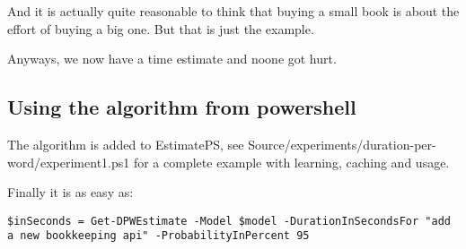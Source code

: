 And it is actually quite reasonable to think that buying a small book is
about the effort of buying a big one. But that is just the example.

Anyways, we now have a time estimate and noone got hurt.

\hypertarget{using-the-algorithm-from-powershell}{%
\subsection{Using the algorithm from powershell}}

The algorithm is added to EstimatePS, see
Source/experiments/duration-per-word/experiment1.ps1 for a complete
example with learning, caching and usage.

Finally it is as easy as:

\begin{verbatim}
$inSeconds = Get-DPWEstimate -Model $model -DurationInSecondsFor "add a new bookkeeping api" -ProbabilityInPercent 95
\end{verbatim}

